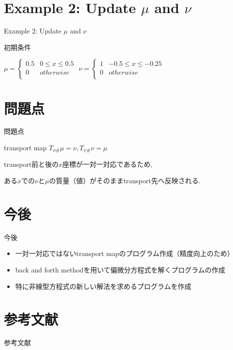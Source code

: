 \documentclass[dvipdfmx, 12pt]{beamer}
\begin{document}
\section{Example 2: Update $\mu$ and $\nu$}
\begin{frame}{Example 2: Update $\mu$ and $\nu$}

    初期条件
    \begin{center}
    $\mu = \left\{
        \begin{array}{ll}
            0.5 & 0 \le x \le 0.5 \\
            0 & otherwise \\
        \end{array}
    \right.
    $
    $\nu = \left\{
        \begin{array}{ll}
            1 & - 0.5 \le x \le - 0.25 \\
            0 & otherwise \\
        \end{array}
    \right.
    $
    \end{center}

\end{frame}

\section{問題点}
\begin{frame}{問題点}

    \begin{block}{transport map}
        $T_{\phi \#} \mu = \nu, T_{\psi \#} \nu = \mu$
    \end{block}

    transport前と後の$x$座標が一対一対応であるため,

    ある$x$での$\nu$と$\mu$の質量（値）がそのままtransport先へ反映される.

\end{frame}

\section{今後}
\begin{frame}{今後}
    \begin{itemize}
        \item 一対一対応ではないtransport mapのプログラム作成（精度向上のため）
        \item back and forth methodを用いて偏微分方程式を解くプログラムの作成
        \item 特に非線型方程式の新しい解法を求めるプログラムを作成
    \end{itemize}
    \cite{MR0096552}
    \cite{MR1491362}
\end{frame}

\section{参考文献}
\begin{frame}{参考文献}
    
\end{frame}
\end{document}
